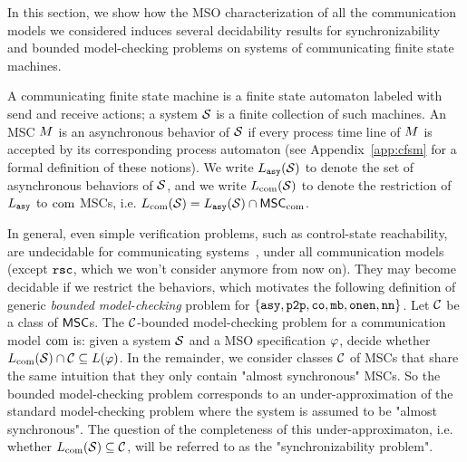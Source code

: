 

In this section, we show how the MSO characterization of all the communication
models we considered induces several decidability results for
synchronizability and bounded model-checking problems on systems of
communicating finite state machines.

A communicating finite state machine is a finite state automaton labeled with send
and receive actions; a system $\mathcal{S}$ is a finite collection of such machines.
An MSC $M$ is an asynchronous behavior of $\mathcal{S}$ if every process
time line of $M$ is accepted by its corresponding process automaton
\ifappendix
(see Appendix~\ref{app:cfsm} for a formal definition of these notions).
\fi
We write $L_{\mathtt{asy}}(\mathcal{S})$ to denote the set of asynchronous behaviors of $\mathcal{S}$,
and we write $L_{\textup{com}}(\mathcal{S})$ to denote the restriction of $L_{\mathtt{asy}}$ to $\textup{com}$ MSCs,
i.e. $L_{\textup{com}}(\mathcal{S})=L_{\mathtt{asy}}(\mathcal{S})\cap\mathsf{MSC}_{\textup{com}}$.

In general, even simple verification problems, such
as control-state reachability, are undecidable for
communicating systems~\cite{DBLP:journals/jacm/BrandZ83}, under all communication models (except
$\mathtt{rsc}$, which we won't consider anymore from now on).
They may become decidable if we restrict the behaviors, which motivates the following
definition of  generic \emph{bounded model-checking} problem for $\{\mathtt{asy}, \mathtt{p2p}, \mathtt{co}, \mathtt{mb}, \mathtt{onen}, \mathtt{nn} \}$. 
%
Let $\mathcal{C}$ be a class of $\mathsf{MSC}$s. The $\mathcal{C}$-bounded model-checking problem
for a communication model $\textup{com}$ is: given a system $\mathcal{S}$ and a MSO
specification $\varphi$, decide whether
$L_{\textup{com}}(\mathcal{S})\cap \mathcal{C} \subseteq L(\varphi)$.
%
In the remainder, we  consider classes $\mathcal{C}$ of MSCs that share the same intuition
that they only contain "almost synchronous" MSCs. So the bounded model-checking problem
corresponds to an under-approximation of the standard model-checking problem where the
system is assumed to be "almost synchronous". The question of the completeness of this under-approximaton, 
i.e. whether $L_{\textup{com}}(\mathcal{S})\subseteq \mathcal{C}$, will be 
referred to as the "synchronizability problem".


